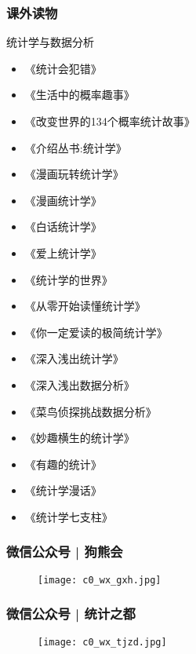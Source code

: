 \begin{frame}
  \frametitle{课外读物}
    \begin{block}{统计学与数据分析}
      \begin{multicols}{2}
      \begin{itemize}
         \item 《统计会犯错》
         \item 《生活中的概率趣事》
         \item 《改变世界的134个概率统计故事》
         \item 《介绍丛书:统计学》
         \item 《漫画玩转统计学》
         \item 《漫画统计学》
         \item 《白话统计学》
         \item 《爱上统计学》
         \item 《统计学的世界》
         \item 《从零开始读懂统计学》
         \item 《你一定爱读的极简统计学》
         \item 《深入浅出统计学》
         \item 《深入浅出数据分析》
         \item 《菜鸟侦探挑战数据分析》
         \item 《妙趣横生的统计学》
         \item 《有趣的统计》
         \item 《统计学漫话》
         \item 《统计学七支柱》
        \end{itemize}
      \end{multicols}
    \end{block}
\end{frame}

\begin{frame}
  \frametitle{微信公众号 | 狗熊会}
  \begin{figure}
    \centering
    \texttt{[image: c0\_wx\_gxh.jpg]}
  \end{figure}
\end{frame}

\begin{frame}
  \frametitle{微信公众号 | 统计之都}
  \begin{figure}
    \centering
    \texttt{[image: c0\_wx\_tjzd.jpg]}
  \end{figure}
\end{frame}


